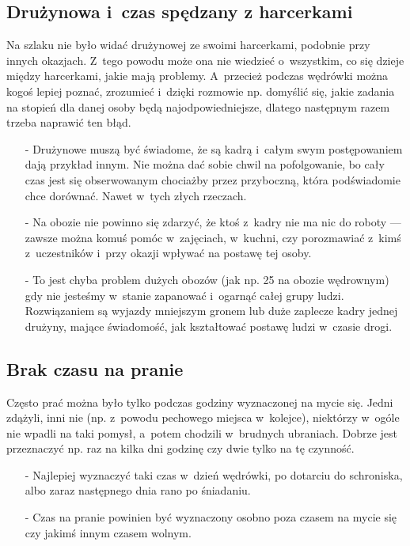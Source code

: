 \subsection{Drużynowa i~czas spędzany z harcerkami}
Na szlaku nie było widać drużynowej ze swoimi harcerkami, podobnie przy innych okazjach. Z~tego powodu może ona nie wiedzieć o~wszystkim, co się dzieje między harcerkami, jakie mają problemy. A~przecież podczas wędrówki można kogoś lepiej poznać, zrozumieć i~dzięki rozmowie np. domyślić się, jakie zadania na stopień dla danej osoby będą najodpowiedniejsze, dlatego następnym razem trzeba naprawić ten błąd.
\begin{itemize}
\item[-] Drużynowe muszą być świadome, że są kadrą i~całym swym postępowaniem dają przykład innym. Nie można dać sobie chwil na pofolgowanie, bo cały czas jest się obserwowanym chociażby przez przyboczną, która podświadomie chce dorównać. Nawet w~tych złych rzeczach.
\item[-] Na obozie nie powinno się zdarzyć, że ktoś z~kadry nie ma nic do roboty --- zawsze można komuś pomóc w~zajęciach, w~kuchni, czy porozmawiać z~kimś z~uczestników i~przy okazji wpływać na postawę tej osoby.
\item[-] To jest chyba problem dużych obozów (jak np. 25 na obozie wędrownym) gdy nie jesteśmy w~stanie zapanować i~ogarnąć całej grupy ludzi. Rozwiązaniem są wyjazdy mniejszym gronem lub duże zaplecze kadry jednej drużyny, mające świadomość, jak kształtować postawę ludzi w~czasie drogi.
\end{itemize}
\subsection{Brak czasu na pranie}
Często prać można było tylko podczas godziny wyznaczonej na mycie się. Jedni zdążyli, inni nie (np. z~powodu pechowego miejsca w~kolejce), niektórzy w~ogóle nie wpadli na taki pomysł, a~potem chodzili w~brudnych ubraniach. Dobrze jest przeznaczyć np. raz na kilka dni godzinę czy dwie tylko na tę czynność.
\begin{itemize}
\item[-] Najlepiej wyznaczyć taki czas w~dzień wędrówki, po dotarciu do schroniska, albo zaraz następnego dnia rano po śniadaniu.
\item[-] Czas na pranie powinien być wyznaczony osobno poza czasem na mycie się czy jakimś innym czasem wolnym.
\end{itemize}
